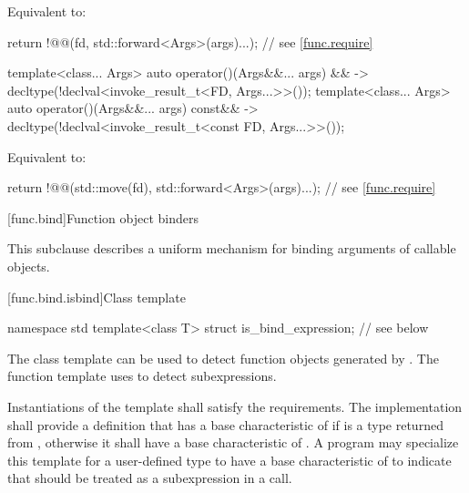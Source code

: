 \begin{itemdescr}
\pnum
\effects
Equivalent to:
\begin{codeblock}
return !@@(fd, std::forward<Args>(args)...);              // see \ref{func.require}
\end{codeblock}
\end{itemdescr}

\begin{itemdecl}
template<class... Args>
  auto operator()(Args&&... args) &&
    -> decltype(!declval<invoke_result_t<FD, Args...>>());
template<class... Args>
  auto operator()(Args&&... args) const&&
    -> decltype(!declval<invoke_result_t<const FD, Args...>>());
\end{itemdecl}

\begin{itemdescr}
\pnum
\effects
Equivalent to:
\begin{codeblock}
return !@@(std::move(fd), std::forward<Args>(args)...);   // see \ref{func.require}
\end{codeblock}
\end{itemdescr}

[func.bind]{Function object binders}%

\pnum
This subclause describes a uniform mechanism for binding
arguments of callable objects.

[func.bind.isbind]{Class template }

%
\begin{codeblock}
namespace std {
  template<class T> struct is_bind_expression;  // see below
}
\end{codeblock}

\pnum
The class template  can be used to detect function objects
generated by . The function template 
uses  to detect subexpressions.

\pnum
Instantiations of the  template shall satisfy
the  requirements. The implementation
shall provide a definition that has a base characteristic of
 if  is a type returned from ,
otherwise it shall have a base characteristic of .
A program may specialize this template for a user-defined type 
to have a base characteristic of  to indicate that
 should be treated as a subexpression in a  call.

